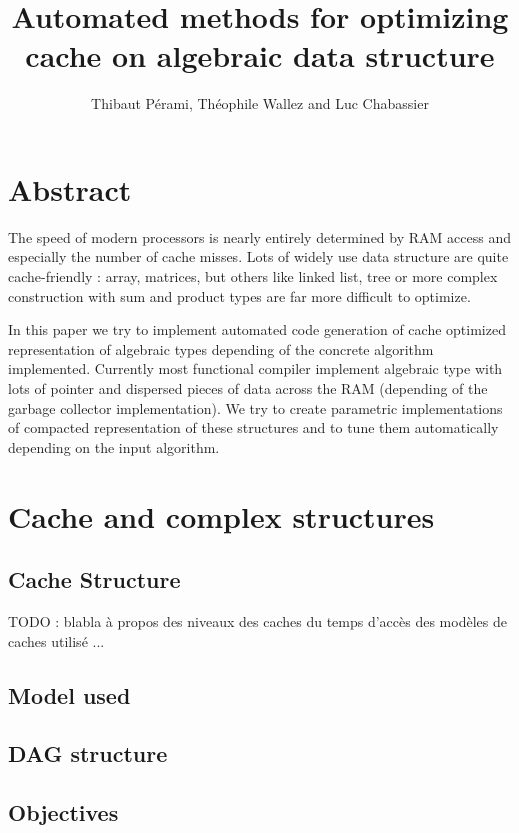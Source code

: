 \documentclass[12pt]{article}
\title{Automated methods for optimizing cache on algebraic data structure}
\author{Thibaut Pérami, Théophile Wallez and Luc Chabassier}
\begin{document}
\maketitle


\section{Abstract}

The speed of modern processors is nearly entirely determined by RAM access and
especially the number of cache misses. Lots of widely use data structure are
quite cache-friendly : array, matrices, but others like linked list, tree or
more complex construction with sum and product types are far more difficult to
optimize.

In this paper we try to implement automated code generation of cache optimized
representation of algebraic types depending of the concrete algorithm
implemented. Currently most functional compiler implement algebraic type with
lots of pointer and dispersed pieces of data across the RAM (depending of the
garbage collector implementation). We try to create parametric implementations
of compacted representation of these structures and to tune them automatically
depending on the input algorithm.

\section{Cache and complex structures}

\subsection{Cache Structure}

TODO : blabla à propos des niveaux des caches du temps d'accès des modèles de
caches utilisé ...

\subsection{Model used}

\subsection{DAG structure}

\subsection{Objectives}
\end{document}
